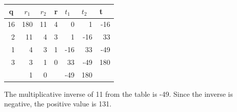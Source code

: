 \documentclass[a4paper]{exam}
\begin{document}
\begin{questions}
        \begin{solution}
            \begin{table}[H]
                \begin{center}
                    \begin{tabular}{|r|r|r|r|r|r|r|}
                    \hline
                    \multicolumn{1}{|c|}{\textbf{q}}               & \multicolumn{1}{c|}{\textbf{$r_1$}} & \multicolumn{1}{c|}{\textbf{$r_2$}} & \multicolumn{1}{c|}{\textbf{r}}               & \multicolumn{1}{l|}{\textbf{$t_1$}} & \multicolumn{1}{l|}{\textbf{$t_2$}} & \multicolumn{1}{l|}{\textbf{t}}               \\ \hline
                    16                                             & 180                                 & 11                                  & 4                                             & 0                                   & 1                                   & -16                                           \\ \hline
                    2                                              & 11                                  & 4                                   & 3                                             & 1                                   & -16                                 & 33                                            \\ \hline
                    1                                              & 4                                   & 3                                   & 1                                             & -16                                 & 33                                  & -49                                           \\ \hline
                    3                                              & 3                                   & 1                                   & 0                                             & 33                                  & -49                                 & 180                                           \\ \hline
                    \multicolumn{1}{|l|}{}                         & 1                                   & 0                                   & \multicolumn{1}{l|}{}                         & -49                                 & 180                                 & \multicolumn{1}{l|}{} \\ \hline
                    \end{tabular}
                \end{center}
            \end{table}
            The multiplicative inverse of 11 from the table is -49. Since the inverse is negative, the positive value is 131.
        \end{solution}


\end{questions}
\end{document}
